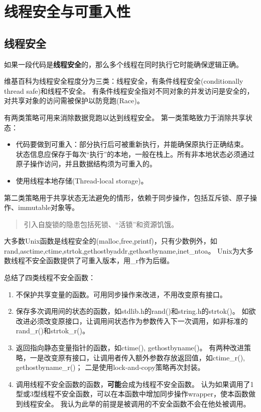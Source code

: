 \section{线程安全与可重入性}

\subsection{线程安全}
如果一段代码是\textbf{线程安全}的，那么多个线程在同时执行它时能确保逻辑正确。

维基百科为线程安全程度分为三类：线程安全，有条件线程安全(conditionally thread safe)和线程不安全。
有条件线程安全指对不同对象的并发访问是安全的，对共享对象的访问需被保护以防竞跑(Race)。

有两类策略可用来消除数据竞跑以达到线程安全。
第一类策略致力于消除共享状态：
\begin{itemize}
\item 代码要做到可重入：部分执行后可被重新执行，并能确保原执行正确结束。
状态信息应保存于每次“执行”的本地，一般在栈上。所有非本地状态必须通过原子操作访问，并且数据结构须为可重入的。
\item 使用线程本地存储(Thread-local storage)。
\end{itemize}
第二类策略用于共享状态无法避免的情形，依赖于同步操作，包括互斥锁、原子操作、immutable对象等。
\begin{quotation}
引入自旋锁的隐患包括死锁、“活锁”和资源饥饿。
\end{quotation}

大多数Unix函数是线程安全的(malloc,free,printf)，只有少数例外，如rand,asctime,ctime,strtok,gethostbyaddr,gethostbyname,inet\_ntoa。
Unix为大多数线程不安全函数提供了可重入版本，用\_r作为后缀。

\cite{csapp}总结了四类线程不安全函数：
\begin{enumerate}
\item 不保护共享变量的函数。可用同步操作来改进，不用改变原有接口。
\item 保存多次调用间的状态的函数，如stdlib.h的rand()和string.h的strtok()。
	如欲改进必须改变原接口，让调用间状态作为参数传入下一次调用，如非标准的rand\_r()和strtok\_r()。
\item 返回指向静态变量指针的函数，如ctime(), gethostbyname()。
有两种改进策略，一是改变原有接口，让调用者传入额外参数存放返回值，如ctime\_r(), gethostbyname\_r()；
二是使用lock-and-copy策略再次封装。
\item 调用线程不安全函数的函数，\textbf{可能}会成为线程不安全函数。
\cite{csapp}认为如果调用了1型或3型线程不安全函数，可以在本函数中增加同步操作wrapper，使本函数做到线程安全。
我认为此举的前提是被调用的不安全函数不会在他处被调用。
\end{enumerate}


